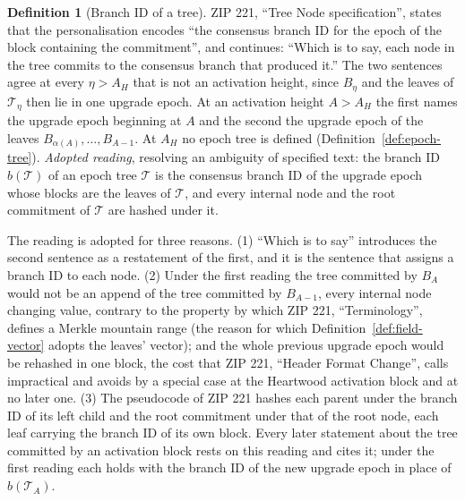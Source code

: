 \documentclass[11pt,a4paper]{article}
\theoremstyle{definition}
\newtheorem{definition}[theorem]{Definition}
\begin{document}
\begin{definition}[Branch ID of a tree]\label{def:tree-branch}
ZIP 221, ``Tree Node specification'', states that the personalisation
encodes ``the consensus branch ID for the epoch of the block containing the
commitment'', and continues: ``Which is to say, each node in the tree
commits to the consensus branch that produced it.'' The two sentences agree
at every $\eta > A_H$ that is not an activation height, since $B_\eta$ and
the leaves of $\mathcal{T}_\eta$ then lie in one upgrade epoch. At an
activation height $A > A_H$ the first names the upgrade epoch beginning at
$A$ and the second the upgrade epoch of the leaves
$B_{\alpha(A)}, \dots, B_{A-1}$. At $A_H$ no epoch tree is defined
(Definition~\ref{def:epoch-tree}). \emph{Adopted reading}, resolving an
ambiguity of specified text: the branch ID $b(\mathcal{T})$ of an epoch tree
$\mathcal{T}$ is the consensus branch ID of the upgrade epoch whose blocks
are the leaves of $\mathcal{T}$, and every internal node and the root
commitment of $\mathcal{T}$ are hashed under it.
\end{definition}

The reading is adopted for three reasons. (1) ``Which is to say'' introduces
the second sentence as a restatement of the first, and it is the sentence
that assigns a branch ID to each node. (2) Under the first reading the tree
committed by $B_A$ would not be an append of the tree committed by
$B_{A-1}$, every internal node changing value, contrary to the property by
which ZIP 221, ``Terminology'', defines a Merkle mountain range (the reason
for which Definition~\ref{def:field-vector} adopts the leaves' vector); and
the whole previous upgrade epoch would be rehashed in one block, the cost
that ZIP 221, ``Header Format Change'', calls impractical and avoids by a
special case at the Heartwood activation block and at no later one. (3) The
pseudocode of ZIP 221 hashes each parent under the branch ID of its left
child and the root commitment under that of the root node, each leaf
carrying the branch ID of its own block. Every later statement about the
tree committed by an activation block rests on this reading and cites it;
under the first reading each holds with the branch ID of the new upgrade
epoch in place of $b(\mathcal{T}_A)$.
\end{document}
